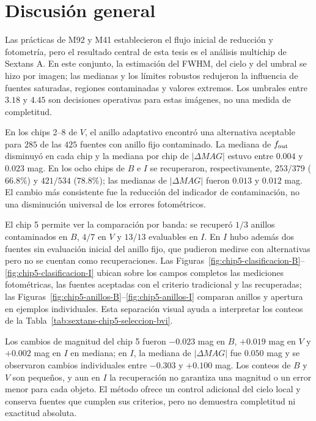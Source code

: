 \documentclass[12pt,letterpaper,oneside]{book}
\begin{document}
\section{Discusión general}

Las prácticas de M92 y M41 establecieron el flujo inicial de reducción y fotometría, pero el resultado central de esta tesis es el análisis multichip de Sextans A. En este conjunto, la estimación del FWHM, del cielo y del umbral se hizo por imagen; las medianas y los límites robustos redujeron la influencia de fuentes saturadas, regiones contaminadas y valores extremos. Los umbrales entre $3.18$ y $4.45$ son decisiones operativas para estas imágenes, no una medida de completitud.

En los chips 2--8 de $V$, el anillo adaptativo encontró una alternativa aceptable para $285$ de las $425$ fuentes con anillo fijo contaminado. La mediana de $f_{\rm out}$ disminuyó en cada chip y la mediana por chip de $|\Delta MAG|$ estuvo entre $0.004$ y $0.023$ mag. En los ocho chips de $B$ e $I$ se recuperaron, respectivamente, $253/379$ ($66.8\%$) y $421/534$ ($78.8\%$); las medianas de $|\Delta MAG|$ fueron $0.013$ y $0.012$ mag. El cambio más consistente fue la reducción del indicador de contaminación, no una disminución universal de los errores fotométricos.

El chip 5 permite ver la comparación por banda: se recuperó $1/3$ anillos contaminados en $B$, $4/7$ en $V$ y $13/13$ evaluables en $I$. En $I$ hubo además dos fuentes sin evaluación inicial del anillo fijo, que pudieron medirse con alternativas pero no se cuentan como recuperaciones. Las Figuras~\ref{fig:chip5-clasificacion-B}--\ref{fig:chip5-clasificacion-I} ubican sobre los campos completos las mediciones fotométricas, las fuentes aceptadas con el criterio tradicional y las recuperadas; las Figuras~\ref{fig:chip5-anillos-B}--\ref{fig:chip5-anillos-I} comparan anillos y apertura en ejemplos individuales. Esta separación visual ayuda a interpretar los conteos de la Tabla~\ref{tab:sextans-chip5-seleccion-bvi}.

Los cambios de magnitud del chip 5 fueron $-0.023$ mag en $B$, $+0.019$ mag en $V$ y $+0.002$ mag en $I$ en mediana; en $I$, la mediana de $|\Delta MAG|$ fue $0.050$ mag y se observaron cambios individuales entre $-0.303$ y $+0.100$ mag. Los conteos de $B$ y $V$ son pequeños, y aun en $I$ la recuperación no garantiza una magnitud o un error menor para cada objeto. El método ofrece un control adicional del cielo local y conserva fuentes que cumplen sus criterios, pero no demuestra completitud ni exactitud absoluta.
\end{document}
